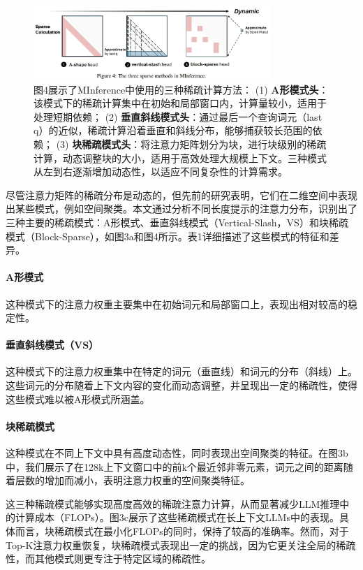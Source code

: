 \documentclass[twocolumn, 10pt]{article} %
\theoremstyle{remark}
\begin{document}
\begin{figure}[ht]
    \centering
    \includegraphics[width=0.8\textwidth]{the_three_sparse_methods_in_minference.png}
    \caption{
        图4展示了MInference中使用的三种稀疏计算方法： (1) \textbf{A形模式头}：该模式下的稀疏计算集中在初始和局部窗口内，计算量较小，适用于处理短期依赖； (2) \textbf{垂直斜线模式头}：通过最后一个查询词元（last q）的近似，稀疏计算沿着垂直和斜线分布，能够捕获较长范围的依赖； (3) \textbf{块稀疏模式头}：将注意力矩阵划分为块，进行块级别的稀疏计算，动态调整块的大小，适用于高效处理大规模上下文。三种模式从左到右逐渐增加动态性，以适应不同复杂性的计算需求。
    }
\end{figure}


尽管注意力矩阵的稀疏分布是动态的，但先前的研究表明，它们在二维空间中表现出某些模式，例如空间聚类。本文通过分析不同长度提示的注意力分布，识别出了三种主要的稀疏模式：A形模式、垂直斜线模式（Vertical-Slash，VS）和块稀疏模式（Block-Sparse），如图3a和图4所示。表1详细描述了这些模式的特征和差异。

\paragraph{A形模式} 这种模式下的注意力权重主要集中在初始词元和局部窗口上，表现出相对较高的稳定性。

\paragraph{垂直斜线模式（VS）} 这种模式下的注意力权重集中在特定的词元（垂直线）和词元的分布（斜线）上。这些词元的分布随着上下文内容的变化而动态调整，并呈现出一定的稀疏性，使得这些模式难以被A形模式所涵盖。

\paragraph{块稀疏模式} 这种模式在不同上下文中具有高度动态性，同时表现出空间聚类的特征。在图3b中，我们展示了在128k上下文窗口中的前k个最近邻非零元素，词元之间的距离随着层数的增加而减小，表明注意力权重的空间聚类特征。

这三种稀疏模式能够实现高度高效的稀疏注意力计算，从而显著减少LLM推理中的计算成本（FLOPs）。图3c展示了这些稀疏模式在长上下文LLMs中的表现。具体而言，块稀疏模式在最小化FLOPs的同时，保持了较高的准确率。然而，对于Top-K注意力权重恢复，块稀疏模式表现出一定的挑战，因为它更关注全局的稀疏性，而其他模式则更专注于特定区域的稀疏性。
\end{document}

